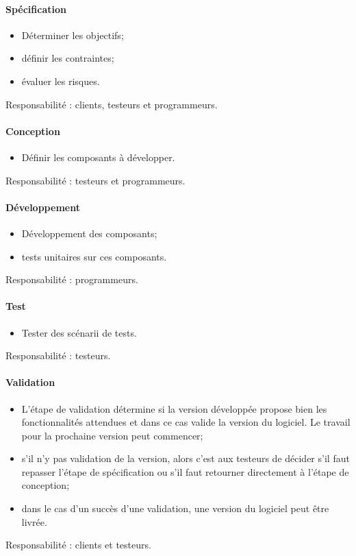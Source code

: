 \documentclass[a4paper,11pt,french]{article}
\begin{document}
\paragraph{Spécification}
\begin{itemize}
 \item Déterminer les objectifs;
 \item définir les contraintes;
 \item évaluer les risques.
\end{itemize}
Responsabilité : clients, testeurs et programmeurs.

\paragraph{Conception}
\begin{itemize}
 \item Définir les composants à développer.
\end{itemize}
Responsabilité : testeurs et programmeurs.

\paragraph{Développement}
\begin{itemize}
 \item Développement des composants;
 \item tests unitaires sur ces composants.
\end{itemize}
Responsabilité : programmeurs.

\paragraph{Test}
\begin{itemize}
 \item Tester des scénarii de tests.
\end{itemize}
Responsabilité : testeurs.

\paragraph{Validation}
\begin{itemize}
 \item L'étape de validation détermine si la version développée propose bien les
fonctionnalités attendues et dans ce cas valide la version du logiciel.
Le travail pour la prochaine version peut commencer;
 \item s'il n'y pas validation de la version, alors c'est aux testeurs de
décider s'il faut repasser l'étape de spécification ou s'il faut retourner
directement à l'étape de conception;
 \item dans le cas d'un succès d'une validation, une version du logiciel peut 
être livrée.
\end{itemize}
Responsabilité : clients et testeurs.
\end{document}
